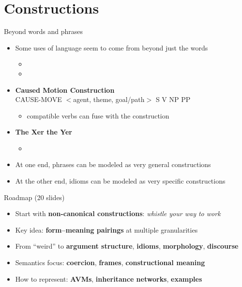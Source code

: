 \section{Constructions}

\begin{frame}{Beyond words and phrases}

\begin{itemize}
\item Some uses of language seem to come from beyond just the words
  \begin{itemize}
  \item {}
  \item {}
  \end{itemize}
\item \textbf{Caused Motion Construction}
  \\ CAUSE-MOVE $<$agent, theme, goal/path$>$ \into S V NP PP
  \begin{itemize}
  \item compatible verbs can fuse with the construction
  \end{itemize}
\item \textbf{The Xer the Yer}
  \begin{itemize}
  \item {}
  \end{itemize}
\item At one end, phrases can be modeled as very general constructions
\item At the other end, idioms can be modeled as very specific constructions
\end{itemize}

\end{frame}


\begin{frame}{Roadmap (20 slides)}
\begin{itemize}
  \item Start with \textbf{non-canonical constructions}: \emph{whistle your way to work}
  \item Key idea: \textbf{form--meaning pairings} at multiple granularities
  \item From ``weird'' to \textbf{argument structure}, \textbf{idioms}, \textbf{morphology}, \textbf{discourse}
  \item Semantics focus: \textbf{coercion}, \textbf{frames}, \textbf{constructional meaning}
  \item How to represent: \textbf{AVMs}, \textbf{inheritance networks}, \textbf{examples}
\end{itemize}
\end{frame}

